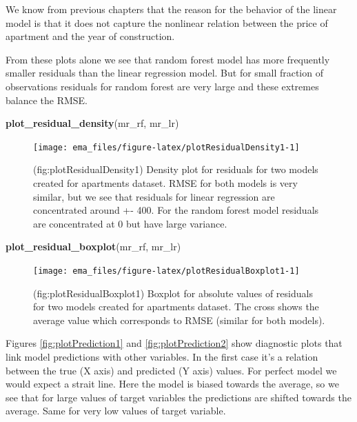\documentclass[12pt,]{krantz}
\newenvironment{Shaded}{\begin{snugshade}}{\end{snugshade}}
\newcommand{\KeywordTok}[1]{\textcolor[rgb]{0.13,0.29,0.53}{\textbf{#1}}}
\newcommand{\NormalTok}[1]{#1}
\begin{document}
We know from previous chapters that the reason for the behavior of the linear model is that it does not capture the nonlinear relation between the price of apartment and the year of construction.

From these plots alone we see that random forest model has more frequently smaller residuals than the linear regression model. But for small fraction of observations residuals for random forest are very large and these extremes balance the RMSE.

\begin{Shaded}
\begin{Highlighting}[]
\KeywordTok{plot_residual_density}\NormalTok{(mr_rf, mr_lr)}
\end{Highlighting}
\end{Shaded}

\begin{figure}

{\centering \texttt{[image: ema\_files/figure-latex/plotResidualDensity1-1]} 

}

\caption{(fig:plotResidualDensity1) Density plot for residuals for two models created for apartments dataset. RMSE for both models is very similar, but we see that residuals for linear regression are concentrated around +- 400. For the random forest model residuals are concentrated at 0 but have large variance.}\label{fig:plotResidualDensity1}
\end{figure}

\begin{Shaded}
\begin{Highlighting}[]
\KeywordTok{plot_residual_boxplot}\NormalTok{(mr_rf, mr_lr)}
\end{Highlighting}
\end{Shaded}

\begin{figure}

{\centering \texttt{[image: ema\_files/figure-latex/plotResidualBoxplot1-1]} 

}

\caption{(fig:plotResidualBoxplot1) Boxplot for absolute values of residuals for two models created for apartments dataset. The cross shows the average value which corresponds to RMSE (similar for both models).}\label{fig:plotResidualBoxplot1}
\end{figure}

Figures \ref{fig:plotPrediction1} and \ref{fig:plotPrediction2} show diagnostic plots that link model predictions with other variables. In the first case it's a relation between the true (X axis) and predicted (Y axis) values. For perfect model we would expect a strait line. Here the model is biased towards the average, so we see that for large values of target variables the predictions are shifted towards the average. Same for very low values of target variable.
\end{document}
